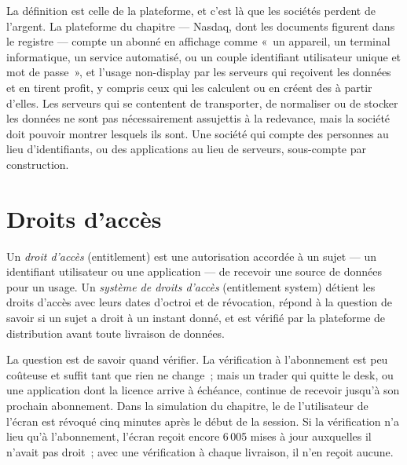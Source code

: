 La définition est celle de la plateforme, et c'est là que les sociétés perdent de l'argent. La plateforme du chapitre --- Nasdaq, dont les documents figurent dans le registre --- compte un
abonné en affichage comme «~un appareil, un terminal informatique, un service automatisé, ou un couple identifiant utilisateur unique
et mot de passe~», et l'usage non-display par les serveurs qui reçoivent les données et en tirent profit, y compris ceux qui les calculent ou
en créent des  à partir d'elles. Les serveurs qui se contentent de transporter, de normaliser ou de stocker les données ne sont pas nécessairement assujettis à la redevance, mais la société doit pouvoir
montrer lesquels ils sont. Une société qui compte des personnes au lieu d'identifiants, ou des applications au lieu de serveurs, sous-compte par construction.

\section{Droits d'accès}

\begin{definition}\label{def:pl:market-data-distribution-and-entitlements:entitlement}
Un \emph{droit d'accès} (entitlement) est une autorisation accordée à un sujet --- un identifiant utilisateur ou une application --- de recevoir une source de
données pour un usage. Un \emph{système de droits d'accès} (entitlement system) détient les droits d'accès avec leurs dates d'octroi et de révocation,
répond à la question de savoir si un sujet a droit à un instant donné, et est vérifié par la plateforme de distribution avant toute livraison de données.
\end{definition}

La question est de savoir quand vérifier. La vérification à l'abonnement est peu coûteuse et suffit tant que rien ne change~; mais un trader qui quitte le desk, ou une
application dont la licence arrive à échéance, continue de recevoir jusqu'à son prochain abonnement. Dans la simulation du chapitre, le  de l'utilisateur de l'écran est révoqué cinq
minutes après le début de la session. Si la vérification n'a lieu qu'à l'abonnement, l'écran reçoit encore 6\,005 mises à jour auxquelles il n'avait pas droit~; avec une vérification
à chaque livraison, il n'en reçoit aucune.

